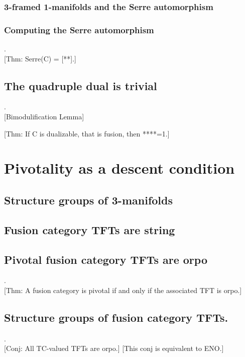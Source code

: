 \documentclass{amsart}
\begin{document}
\subsubsection{3-framed 1-manifolds and the Serre automorphism}

\subsubsection{Computing the Serre automorphism} .\\

	[Thm: Serre(C) = [**].]

\subsection{The quadruple dual is trivial} .\\

	[Bimodulification Lemma]
	
	[Thm: If C is dualizable, that is fusion, then ****=1.]

\section{Pivotality as a descent condition}

\subsection{Structure groups of 3-manifolds}

\subsection{Fusion category TFTs are string}

\subsection{Pivotal fusion category TFTs are orpo} .\\

	[Thm: A fusion category is pivotal if and only if the associated TFT is orpo.]

\subsection{Structure groups of fusion category TFTs.} .\\

	[Conj: All TC-valued TFTs are orpo.] [This conj is equivalent to ENO.]
	
\end{document}
